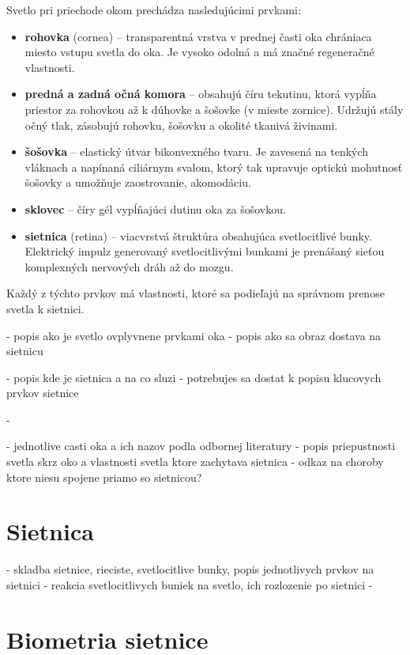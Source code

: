 Svetlo pri priechode okom prechádza nasledujúcimi prvkami\cite{zloz_oka}:
\begin{itemize}
\item \textbf{rohovka} (cornea) -- transparentná vrstva v prednej časti oka chrániaca miesto vstupu svetla do oka. Je vysoko odolná a má značné regeneračné vlastnosti.
\item \textbf{predná a zadná očná komora} -- obsahujú číru tekutinu, ktorá vypĺňa priestor za rohovkou až k dúhovke a šošovke (v mieste zornice). Udržujú stály očný tlak, zásobujú rohovku, šošovku a okolité tkanivá živinami\cite{zmysly}.
\item \textbf{šošovka} -- elastický útvar bikonvexného tvaru. Je zavesená na tenkých vláknach a napínaná ciliárnym svalom, ktorý tak upravuje optickú mohutnosť šošovky a umožňuje zaostrovanie, akomodáciu.
\item \textbf{sklovec} -- číry gél vypĺňajúci dutinu oka za šošovkou.
\item \textbf{sietnica} (retina) -- viacvrstvá štruktúra obsahujúca svetlocitlivé bunky. Elektrický impulz generovaný svetlocitlivými bunkami je prenášaný sieťou komplexných nervových dráh až do mozgu.
\end{itemize}

Každý z týchto prvkov má vlastnosti, ktoré sa podieľajú na správnom prenose svetla k sietnici. 


- popis ako je svetlo ovplyvnene prvkami oka
- popis ako sa obraz dostava na sietnicu

- popis kde je sietnica a na co sluzi \cite{vlast_oka}
- potrebujes sa dostat k popisu klucovych prvkov sietnice

- 

- jednotlive casti oka a ich nazov podla odbornej literatury
- popis priepustnosti svetla skrz oko a vlastnosti svetla ktore zachytava sietnica
- odkaz na choroby ktore niesu spojene priamo so sietnicou?

\section{Sietnica}\label{sec:sietnica}
- skladba sietnice, rieciste, svetlocitlive bunky, popis jednotlivych prvkov na sietnici
- reakcia svetlocitlivych buniek na svetlo, ich rozlozenie po sietnici
- 

\section{Biometria sietnice}\label{sec:bioret}

